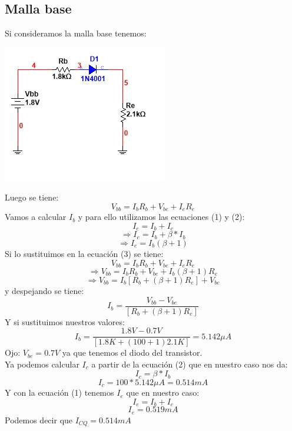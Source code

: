 \documentclass[10pt,a4paper]{article}
\begin{document}
\subsection{Malla base}
Si consideramos la malla base tenemos:
\begin{center}
\includegraphics[scale=1]{Images/Imagen6.jpg}
\end{center}
Luego se tiene:
\begin{equation}
V_{bb}=I_{b}R_{b}+V_{be}+I_{e}R_{e}
\end{equation}
Vamos a calcular $I_{b}$ y para ello utilizamos las ecuaciones (1) y (2):
\[I_{e}=I_{b}+I_{c}\]
\[\Rightarrow I_{e}=I_{b}+\beta*I_{b}\]
\[\Rightarrow I_{e}=I_{b}(\beta+1)\]
Si lo sustituimos en la ecuación (3) se tiene:
\[V_{bb}=I_{b}R_{b}+V_{be}+I_{e}R_{e}\]
\[\Rightarrow V_{bb}=I_{b}R_{b}+V_{be}+I_{b}(\beta+1)R_{e}\]
\[\Rightarrow V_{bb}=I_{b}[R_{b}+(\beta+1)R_{e}]+V_{be}\]
y despejando se tiene:
\[I_{b}=\frac{V_{bb}-V_{be}}{[R_{b}+(\beta+1)R_{e}]}\]
Y si sustituimos nuestros valores:
\[I_{b}=\frac{1.8V-0.7V}{[1.8K+(100+1)2.1K]}=5.142 \mu A\]
Ojo: $V_{be}=0.7V$ ya que tenemos el diodo del transistor.
\\ 
Ya podemos calcular $I_{c}$ a partir de la ecuación (2) que en nuestro caso nos da:
\[I_{c}=\beta*I_{b}\]
\[I_{c}=100*5.142 \mu A= 0.514 mA\]
Y  con la ecuación (1) tenemos $I_{e}$ que en nuestro caso:
\[I_{e}=I_{b}+I_{c}\]
\[I_{e}=0.519 mA\]
Podemos decir que $I_{CQ}=0.514 mA$
\end{document}
